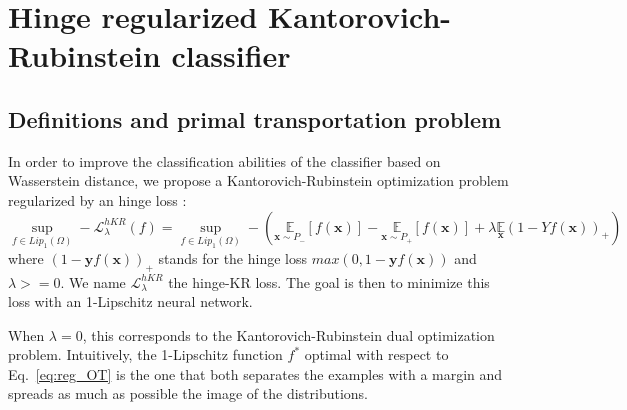 \documentclass{article}
\newcommand{\W}{\mathcal{W}}
\begin{document}
\section{Hinge regularized Kantorovich-Rubinstein classifier }
\label{sec:kr_hinge}
\subsection{Definitions and primal transportation problem}
In order to improve the classification abilities of the classifier based on Wasserstein distance, we propose a Kantorovich-Rubinstein optimization problem regularized by an hinge loss :
\begin{equation}
\label{eq:reg_OT}
\sup_{f \in Lip_1(\Omega)}-\mathcal{L}^{hKR}_\lambda(f)= \sup_{f \in Lip_1(\Omega)}-\left(\underset{\textbf{x}  \sim P_-}{\mathbb{E}} \left[f(\textbf{x})\right] -\underset{\textbf{x} \sim P_+}{\mathbb{E}}\left[f(\textbf{x})\right] +\lambda\underset{\textbf{x}}{\mathbb{E}} \left(1-Yf(\textbf{x})\right)_+\right)
\end{equation}
where $(1-\textbf{y}f(\textbf{x}))_+$ stands for the hinge loss $max(0,1-\textbf{y}f(\textbf{x}))$ and $\lambda>=0$. We name $\mathcal{L}^{hKR}_\lambda$ the hinge-KR loss. The goal is then to minimize this loss with an 1-Lipschitz neural network.


When $\lambda=0$, this corresponds to the Kantorovich-Rubinstein dual optimization problem. Intuitively, the 1-Lipschitz function $f^*$ optimal with respect to Eq.~\eqref{eq:reg_OT} is the one that both separates the examples with a margin and spreads as much as possible the image of the distributions.
\end{document}
